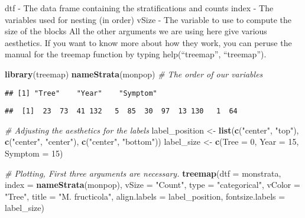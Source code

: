 \documentclass[12pt,]{krantz}
\newenvironment{Shaded}{\begin{snugshade}}{\end{snugshade}}
\newcommand{\KeywordTok}[1]{\textcolor[rgb]{0.27,0.27,0.27}{\textbf{#1}}}
\newcommand{\DataTypeTok}[1]{\textcolor[rgb]{0.27,0.27,0.27}{#1}}
\newcommand{\DecValTok}[1]{\textcolor[rgb]{0.06,0.06,0.06}{#1}}
\newcommand{\StringTok}[1]{\textcolor[rgb]{0.5,0.5,0.5}{#1}}
\newcommand{\CommentTok}[1]{\textcolor[rgb]{0.56,0.35,0.01}{\textit{#1}}}
\newcommand{\OperatorTok}[1]{\textcolor[rgb]{0.81,0.36,0.00}{\textbf{#1}}}
\newcommand{\NormalTok}[1]{#1}
\theoremstyle{definition}
\theoremstyle{definition}
\theoremstyle{definition}
\theoremstyle{remark}
\begin{document}
dtf - The data frame containing the stratifications and counts index -
The variables used for nesting (in order) vSize - The variable to use to
compute the size of the blocks All the other arguments we are using here
give various aesthetics. If you want to know more about how they work,
you can peruse the manual for the treemap function by typing
help(``treemap'', ``treemap'').

\begin{Shaded}
\begin{Highlighting}[]
\KeywordTok{library}\NormalTok{(treemap)}
\KeywordTok{nameStrata}\NormalTok{(monpop) }\CommentTok{# The order of our variables}
\end{Highlighting}
\end{Shaded}

\begin{verbatim}
## [1] "Tree"    "Year"    "Symptom"
\end{verbatim}

\begin{Shaded}
\end{Shaded}

\begin{verbatim}
##  [1]  23  73  41 132   5  85  30  97  13 130   1  64
\end{verbatim}

\begin{Shaded}
\begin{Highlighting}[]
\CommentTok{# Adjusting the aesthetics for the labels}
\NormalTok{label_position <-}\StringTok{ }\KeywordTok{list}\NormalTok{(}\KeywordTok{c}\NormalTok{(}\StringTok{"center"}\NormalTok{, }\StringTok{"top"}\NormalTok{), }\KeywordTok{c}\NormalTok{(}\StringTok{"center"}\NormalTok{, }\StringTok{"center"}\NormalTok{), }\KeywordTok{c}\NormalTok{(}\StringTok{"center"}\NormalTok{, }\StringTok{"bottom"}\NormalTok{))}
\NormalTok{label_size     <-}\StringTok{ }\KeywordTok{c}\NormalTok{(}\DataTypeTok{Tree =} \DecValTok{0}\NormalTok{, }\DataTypeTok{Year =} \DecValTok{15}\NormalTok{, }\DataTypeTok{Symptom =} \DecValTok{15}\NormalTok{)}

\CommentTok{# Plotting, First three arguments are necessary.}
\KeywordTok{treemap}\NormalTok{(}\DataTypeTok{dtf =}\NormalTok{ monstrata, }\DataTypeTok{index =} \KeywordTok{nameStrata}\NormalTok{(monpop), }\DataTypeTok{vSize =} \StringTok{"Count"}\NormalTok{,}
        \DataTypeTok{type =} \StringTok{"categorical"}\NormalTok{, }\DataTypeTok{vColor =} \StringTok{"Tree"}\NormalTok{, }\DataTypeTok{title =} \StringTok{"M. fructicola"}\NormalTok{,}
        \DataTypeTok{align.labels =}\NormalTok{ label_position, }\DataTypeTok{fontsize.labels =}\NormalTok{ label_size)}
\end{Highlighting}
\end{Shaded}
\end{document}
